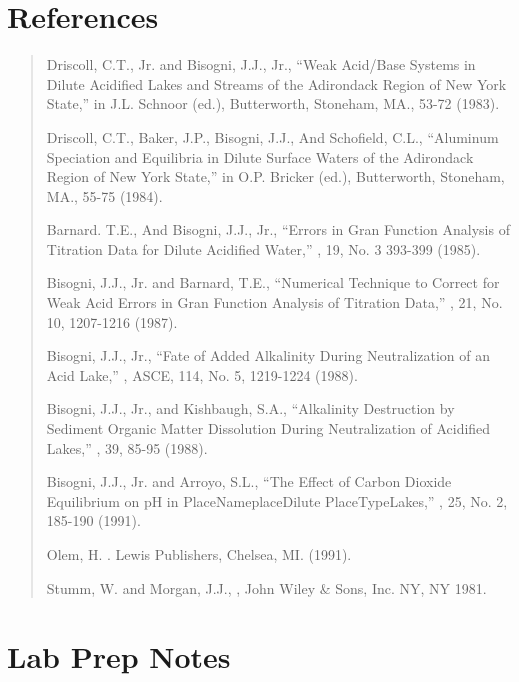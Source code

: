 \documentclass[letterpaper,10pt,english]{sphinxmanual}
\begin{document}
\section{References}
\label{\detokenize{Acid_Rain/Acid_Rain:references}}\label{\detokenize{Acid_Rain/Acid_Rain:heading-acid-rain-references}}\begin{quote}

Driscoll, C.T., Jr. and Bisogni, J.J., Jr., “Weak Acid/Base Systems in Dilute Acidified Lakes and Streams of the Adirondack Region of New York State,” in  J.L. Schnoor (ed.), Butterworth, Stoneham, MA., 53-72 (1983).

Driscoll, C.T., Baker, J.P., Bisogni, J.J., And Schofield, C.L., “Aluminum Speciation and Equilibria in Dilute Surface Waters of the Adirondack Region of New York State,” in  O.P. Bricker (ed.), Butterworth, Stoneham, MA., 55-75 (1984).

Barnard. T.E., And Bisogni, J.J., Jr., “Errors in Gran Function Analysis of Titration Data for Dilute Acidified Water,” , 19, No. 3 393-399 (1985).

Bisogni, J.J., Jr. and Barnard, T.E., “Numerical Technique to Correct for Weak Acid Errors in Gran Function Analysis of Titration Data,” , 21, No. 10, 1207-1216 (1987).

Bisogni, J.J., Jr., “Fate of Added Alkalinity During Neutralization of an Acid Lake,” , ASCE, 114, No. 5, 1219-1224 (1988).

Bisogni, J.J., Jr., and Kishbaugh, S.A., “Alkalinity Destruction by Sediment Organic Matter Dissolution During Neutralization of Acidified Lakes,” , 39, 85-95 (1988).

Bisogni, J.J., Jr. and Arroyo, S.L., “The Effect of Carbon Dioxide Equilibrium on pH in PlaceNameplaceDilute PlaceTypeLakes,” , 25, No. 2, 185-190 (1991).

Olem, H. . Lewis Publishers, Chelsea, MI. (1991).

Stumm, W. and Morgan, J.J., , John Wiley \& Sons, Inc. NY, NY 1981.
\end{quote}


\section{Lab Prep Notes}
\label{\detokenize{Acid_Rain/Acid_Rain:lab-prep-notes}}\label{\detokenize{Acid_Rain/Acid_Rain:heading-acid-rain-lab-prep-notes}}
\end{document}
